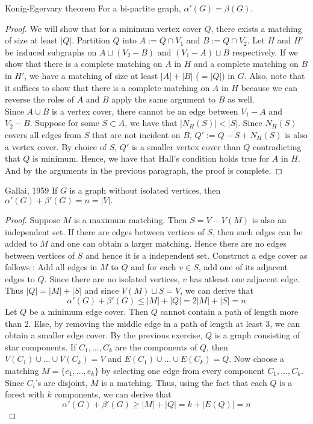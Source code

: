 \documentclass[../basic_graph_theory.tex]{subfiles}
\begin{document}
\begin{Thm}{Konig-Egervary theorem}{} 
    For a bi-partite graph, $\alpha'(G) = \beta(G)$.
\end{Thm}
\begin{proof}
    We will show that for a minimum vertex cover $Q$, there exists a matching of size at least $|Q|$. Partition $Q$ into $A := Q \cap V_1$ and $B := Q \cap V_2$. Let $H$ and $H'$ be induced subgraphs on $A \sqcup (V_2 - B)$ and $(V_1 - A) \sqcup B$ respectively. If we show that there is a complete matching on $A$ in $H$ and a complete matching on $B$ in $H'$, we have a matching of size at least $|A| + |B|$ ($= |Q|$) in $G$.  Also, note that it suffices to show that there is a complete matching on $A$ in $H$ because we can reverse the roles of $A$ and $B$ apply the same argument to $B$ as well. \\
    Since $A \cup B$ is a vertex cover, there cannot be an edge between $V_1 - A$ and $V_2 - B$. Suppose for some $S \subset A$, we have that $|N_H(S)| < |S|$. Since $N_H(S)$ covers all edges from $S$ that are not incident on $B$, $Q' := Q - S + N_H(S)$ is also a vertex cover. By choice of $S$, $Q'$ is a smaller vertex cover than $Q$ contradicting that $Q$ is minimum.  Hence, we have that Hall's condition holds true for $A$ in $H$. And by the arguments in the previous paragraph, the proof is complete.
\end{proof}
\begin{Thm}{Gallai, 1959}{} 
    If $G$ is a graph without isolated vertices, then $\alpha'(G) + \beta'(G) = n = |V|.$
\end{Thm}
%
\begin{proof}
    Suppose $M$ is a maximum matching. Then $S = V - V(M)$ is also an independent set. If there are edges between vertices of $S$, then such edges can be added to $M$ and one can obtain a larger matching. Hence there are no edges between vertices of $S$ and hence it is a independent set. Construct a edge cover as follows : Add all edges in $M$ to $Q$ and for each $v \in S$, add one of its adjacent edges to $Q$.  Since there are no isolated vertices,  $v$ has atleast one adjacent edge.  Thus $|Q| = |M| + |S|$ and since $V(M) \sqcup S = V$, we can derive that
    \[
        \alpha'(G) + \beta'(G) \leq |M| + |Q| = 2|M| + |S| = n
    \]
    Let $Q$ be a minimum edge cover. Then $Q$ cannot contain a path of length more than $2$. Else, by removing the middle edge in a path of length at least 3, we can obtain a smaller edge cover. By the previous exercise, $Q$ is a graph consisting of star components. If $C_1,\ldots,C_k$ are the components of $Q$, then $V(C_1) \cup \ldots \cup V(C_k) = V$ and $E(C_1) \cup \ldots \cup E(C_k) = Q$. Now choose a matching $M = \{e_1,\ldots,e_k\}$ by selecting one edge from every component $C_1,\ldots,C_k$.  Since $C_i$'s are disjoint, $M$ is a matching. Thus, using the fact that each $Q$ is a forest with $k$ components, we can derive that\\
    \[
        \alpha'(G) + \beta'(G)  \geq |M| + |Q| = k + |E(Q)| = n
    \]
\end{proof}
\end{document}
